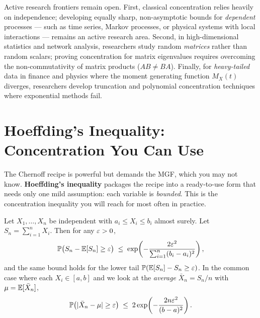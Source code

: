 \begin{historybox}
Active research frontiers remain open. First, classical concentration relies
heavily on independence; developing equally sharp, non-asymptotic bounds for
\emph{dependent} processes --- such as time series, Markov processes, or
physical systems with local interactions --- remains an active research area.
Second, in high-dimensional statistics and network analysis, researchers study
random \emph{matrices} rather than random scalars; proving concentration for
matrix eigenvalues requires overcoming the non-commutativity of matrix products
($AB \ne BA$). Finally, for \emph{heavy-tailed} data in finance and physics
where the moment generating function $M_X(t)$ diverges, researchers develop
truncation and polynomial concentration techniques where exponential methods
fail.
\end{historybox}

\section{Hoeffding's Inequality: Concentration You Can Use}
\label{ch19:hoeffding}

The Chernoff recipe is powerful but demands the MGF, which you may not know.
\textbf{Hoeffding's inequality} packages the recipe into a ready-to-use form
that needs only one mild assumption: each variable is \emph{bounded}. This is
the concentration inequality you will reach for most often in practice.

\begin{theorem}
\label{ch19:hoeff-thm}
Let $X_1, \dots, X_n$ be independent with $a_i \le X_i \le b_i$ almost surely.
Let $S_n = \sum_{i=1}^n X_i$. Then for any $\varepsilon > 0$,
\[
  \operatorname{\mathbb{P}}\bigl(S_n - \operatorname{\mathbb{E}}[S_n] \ge \varepsilon\bigr)
  \;\le\;
  \exp\!\left(-\frac{2\varepsilon^2}{\sum_{i=1}^n (b_i - a_i)^2}\right),
\]
and the same bound holds for the lower tail $\operatorname{\mathbb{P}}(\operatorname{\mathbb{E}}[S_n] - S_n \ge \varepsilon)$. In
the common case where each $X_i \in [a,b]$ and we look at the
\emph{average} $\bar X_n = S_n/n$ with $\mu = \operatorname{\mathbb{E}}[\bar X_n]$,
\[
  \operatorname{\mathbb{P}}\bigl(\lvert\bar X_n - \mu\rvert \ge \varepsilon\bigr)
  \;\le\;
  2\exp\!\left(-\frac{2 n \varepsilon^2}{(b-a)^2}\right).
\]
\end{theorem}

